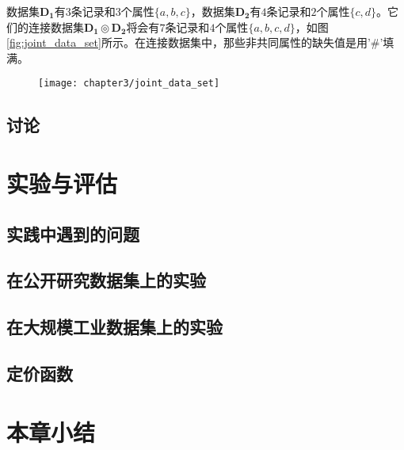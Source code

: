 \begin{exmp}
数据集$\bm{D_1}$有$3$条记录和$3$个属性$\{a,b,c\}$，数据集$\bm{D_2}$有$4$条记录和$2$个属性$\{c,d\}$。它们的连接数据集$\bm{D_1} \circledcirc \bm{D_2}$将会有$7$条记录和$4$个属性$\{a,b,c,d\}$，如图\ref{fig:joint_data_set}所示。在连接数据集中，那些非共同属性的缺失值是用'\#'填满。
\end{exmp}

\begin{figure}[h]
  \centering
    \texttt{[image: chapter3/joint\_data\_set]}
\end{figure}

\subsection{讨论}

\section{实验与评估}

\subsection{实践中遇到的问题}

\subsection{在公开研究数据集上的实验}

\subsection{在大规模工业数据集上的实验}

\subsection{定价函数}

\section{本章小结}